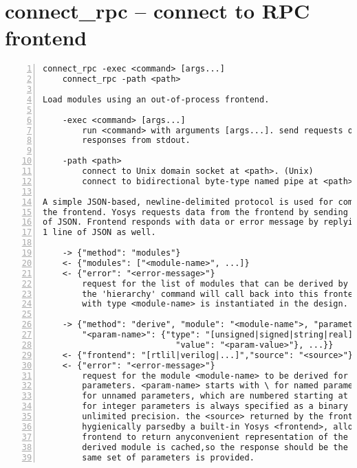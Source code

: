\section{connect\_rpc -- connect to RPC frontend}
\label{cmd:connect_rpc}
\begin{lstlisting}[numbers=left,frame=single]
    connect_rpc -exec <command> [args...]
    connect_rpc -path <path>

Load modules using an out-of-process frontend.

    -exec <command> [args...]
        run <command> with arguments [args...]. send requests on stdin, read
        responses from stdout.

    -path <path>
        connect to Unix domain socket at <path>. (Unix)
        connect to bidirectional byte-type named pipe at <path>. (Windows)

A simple JSON-based, newline-delimited protocol is used for communicating with
the frontend. Yosys requests data from the frontend by sending exactly 1 line
of JSON. Frontend responds with data or error message by replying with exactly
1 line of JSON as well.

    -> {"method": "modules"}
    <- {"modules": ["<module-name>", ...]}
    <- {"error": "<error-message>"}
        request for the list of modules that can be derived by this frontend.
        the 'hierarchy' command will call back into this frontend if a cell
        with type <module-name> is instantiated in the design.

    -> {"method": "derive", "module": "<module-name">, "parameters": {
        "<param-name>": {"type": "[unsigned|signed|string|real]",
                           "value": "<param-value>"}, ...}}
    <- {"frontend": "[rtlil|verilog|...]","source": "<source>"}}
    <- {"error": "<error-message>"}
        request for the module <module-name> to be derived for a specific set of
        parameters. <param-name> starts with \ for named parameters, and with $
        for unnamed parameters, which are numbered starting at 1.<param-value>
        for integer parameters is always specified as a binary string of
        unlimited precision. the <source> returned by the frontend is
        hygienically parsedby a built-in Yosys <frontend>, allowing the RPC
        frontend to return anyconvenient representation of the module. the
        derived module is cached,so the response should be the same whenever the
        same set of parameters is provided.
\end{lstlisting}

